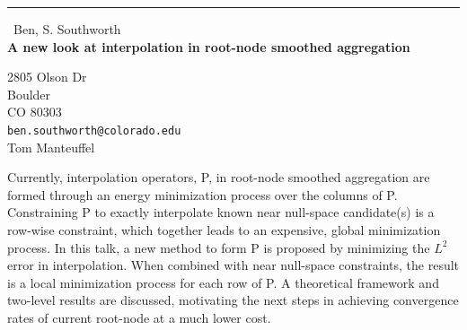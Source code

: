 \documentclass{report}
\begin{document}
\begin{center}
\rule{6in}{1pt} \
{\large Ben, S. Southworth \\
{\bf A new look at interpolation in root-node smoothed aggregation}}

2805 Olson Dr \\ Boulder \\ CO 80303
\\
{\tt ben.southworth@colorado.edu}\\
Tom Manteuffel\end{center}

Currently, interpolation operators, P, in root-node smoothed aggregation
are formed through an energy minimization process over the columns of P.
Constraining P to exactly interpolate known near null-space candidate(s)
is a row-wise constraint, which together leads to an expensive, global
minimization process. In this talk, a new method to form P is proposed by
minimizing the $L^2$ error in interpolation. When combined with near
null-space constraints, the result is a local minimization process for
each row of P. A theoretical framework and two-level results are
discussed, motivating the next steps in achieving convergence rates of
current root-node at a much lower cost.
\end{document}
